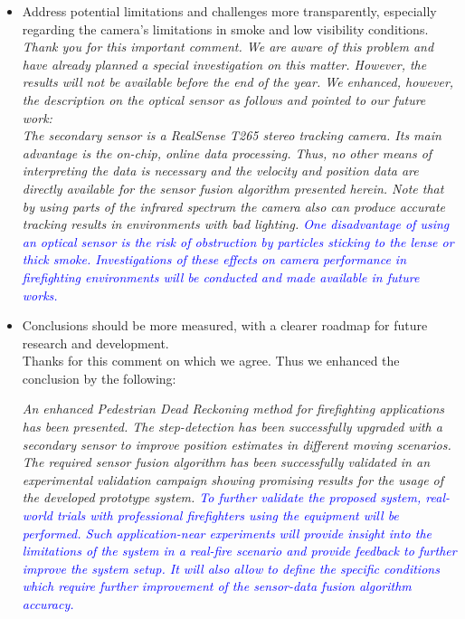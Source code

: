 \documentclass{article}
\begin{document}
\begin{itemize}
\item Address potential limitations and challenges more transparently, especially regarding the camera's limitations in smoke and low visibility conditions.\\


\textit{Thank you for this important comment. We are aware of this problem and have already planned a special investigation on this matter. However, the results will not be available before the end of the year.  We enhanced, however,  the description on the optical sensor as follows and pointed to our future work:\\	
	The secondary sensor is a RealSense T265 stereo tracking camera. Its main advantage is the on-chip, online data processing. Thus, no other means of interpreting the data is necessary and the velocity and position data are directly available for the sensor  fusion algorithm presented herein. Note that by using parts of the infrared spectrum the camera also can produce accurate tracking results in environments with bad lighting. \textcolor{blue}{One disadvantage of using an optical sensor is the risk of obstruction by particles sticking to the lense or thick smoke.  Investigations of these effects on camera performance in firefighting environments will be conducted and made available in  future works.}}\\



\item Conclusions should be more measured, with a clearer roadmap for future research and development.\\

Thanks for this comment on which we agree. Thus we enhanced the conclusion by the following:

\textit{An enhanced Pedestrian Dead Reckoning method for firefighting applications has been presented. The step-detection  has been successfully upgraded with a secondary sensor to improve  position estimates in different moving scenarios. The required sensor fusion algorithm has been successfully  validated in an experimental validation campaign showing promising results for the usage of the developed prototype system.  \textcolor{blue}{To further validate the proposed  system, real-world trials with professional firefighters using the equipment will  be performed. Such application-near experiments will provide insight into the limitations of the system in a real-fire scenario and provide feedback to further improve the system setup. It will also allow to define the specific conditions which require further improvement of the sensor-data fusion algorithm accuracy.}}



\end{itemize}





\end{document}

